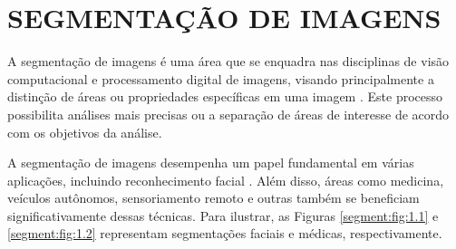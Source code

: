 \newpage
\clearpage
\section{SEGMENTAÇÃO DE IMAGENS}
\label{segment}

A segmentação de imagens é uma área que se enquadra nas disciplinas de visão computacional e processamento digital de imagens, visando principalmente a distinção de áreas ou propriedades específicas em uma imagem \citep{Haralick1985, Yuheng2017, Ghosh2019}. Este processo possibilita análises mais precisas ou a separação de áreas de interesse de acordo com os objetivos da análise.

A segmentação de imagens desempenha um papel fundamental em várias aplicações, incluindo reconhecimento facial \citep{Yuheng2017}. Além disso, áreas como medicina, veículos autônomos, sensoriamento remoto e outras também se beneficiam significativamente dessas técnicas. Para ilustrar, as Figuras \ref{segment:fig:1.1} e \ref{segment:fig:1.2} representam segmentações faciais e médicas, respectivamente.

